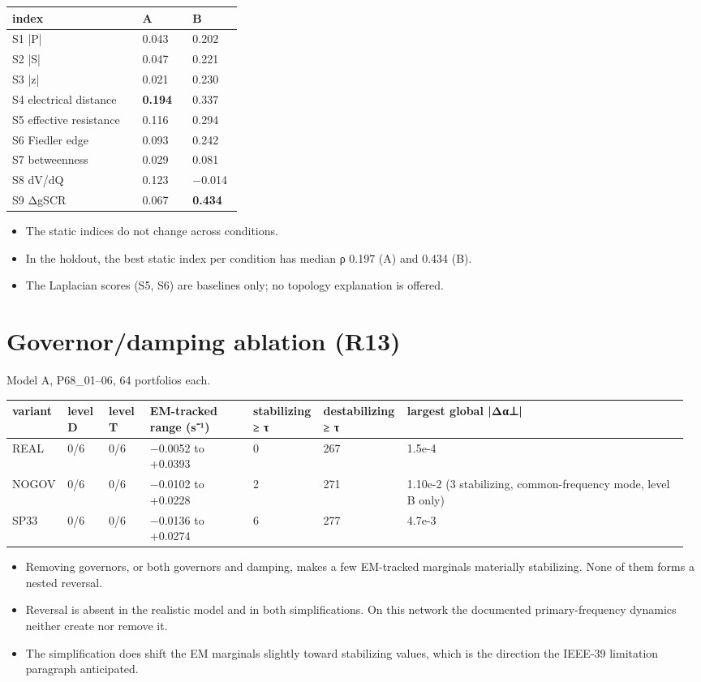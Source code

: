 \documentclass[10pt,a4paper]{article}
\begin{document}
{\small
\begin{longtable}{L{0.527\linewidth}L{0.206\linewidth}L{0.206\linewidth}}
\toprule
\textbf{index} & \textbf{A} & \textbf{B} \\
\midrule
\endhead
S1 |P| & 0.043 & 0.202 \\
S2 |S| & 0.047 & 0.221 \\
S3 |z| & 0.021 & 0.230 \\
S4 electrical distance & \textbf{0.194} & 0.337 \\
S5 effective resistance & 0.116 & 0.294 \\
S6 Fiedler edge & 0.093 & 0.242 \\
S7 betweenness & 0.029 & 0.081 \\
S8 dV/dQ & 0.123 & −0.014 \\
S9 ΔgSCR & 0.067 & \textbf{0.434} \\
\bottomrule
\end{longtable}}
\begin{itemize}
\item The static indices do not change across conditions.
\item In the holdout, the best static index per condition has median ρ 0.197 (A) and 0.434 (B).
\item The Laplacian scores (S5, S6) are baselines only; no topology explanation is offered.
\end{itemize}
\section{Governor/damping ablation (R13)}
Model A, P68\_01–06, 64 portfolios each.

{\small
\begin{longtable}{L{0.060\linewidth}L{0.060\linewidth}L{0.060\linewidth}L{0.153\linewidth}L{0.104\linewidth}L{0.118\linewidth}L{0.418\linewidth}}
\toprule
\textbf{variant} & \textbf{level D} & \textbf{level T} & \textbf{EM-tracked range (s⁻¹)} & \textbf{stabilizing ≥ τ} & \textbf{destabilizing ≥ τ} & \textbf{largest global |Δα⊥|} \\
\midrule
\endhead
REAL & 0/6 & 0/6 & −0.0052 to +0.0393 & 0 & 267 & 1.5e-4 \\
NOGOV & 0/6 & 0/6 & −0.0102 to +0.0228 & 2 & 271 & 1.10e-2 (3 stabilizing, common-frequency mode, level B only) \\
SP33 & 0/6 & 0/6 & −0.0136 to +0.0274 & 6 & 277 & 4.7e-3 \\
\bottomrule
\end{longtable}}
\begin{itemize}
\item Removing governors, or both governors and damping, makes a few EM-tracked marginals materially stabilizing. None of them forms a nested reversal.
\item Reversal is absent in the realistic model and in both simplifications. On this network the documented primary-frequency dynamics neither create nor remove it.
\item The simplification does shift the EM marginals slightly toward stabilizing values, which is the direction the IEEE-39 limitation paragraph anticipated.
\end{itemize}
\end{document}
